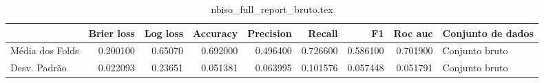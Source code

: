\begin{table}
\centering
\caption{nbiso_full_report_bruto.tex}
\label{nbiso_full_report_bruto.tex}
\begin{tabular}{lrrrrrrrl}
\toprule
{} &  Brier  loss &  Log loss &  Accuracy  &  Precision  &   Recall  &       F1  &  Roc auc  & Conjunto de dados \\
\midrule
Média dos Folds &     0.200100 &   0.65070 &   0.692000 &    0.496400 &  0.726600 &  0.586100 &  0.701900 &    Conjunto bruto \\
Desv. Padrão    &     0.022093 &   0.23651 &   0.051381 &    0.063995 &  0.101576 &  0.057448 &  0.051791 &    Conjunto bruto \\
\bottomrule
\end{tabular}
\end{table}
